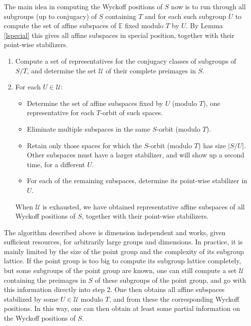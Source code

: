 \documentclass[12pt]{amsart}
\newcommand{\E}{{\mathbb E}}
\newcommand{\U}{{\mathcal U}}
\begin{document}
The main idea in computing the Wyckoff positions of $S$ now is to run 
through all subgroups (up to conjugacy) of $S$ containing $T$ and for 
each such subgroup $U$ to compute the set of affine subspaces of $\E$ 
fixed modulo $T$ by $U$.  By Lemma  \ref{lspecial} this gives all affine 
subspaces in special position, together with their point-wise stabilizers.

\vspace{0.5cm}
\begin{enumerate}
\item \label{WCconj}
        Compute a set of representatives for the conjugacy
        classes of subgroups of $S/T$, and determine the set $\U$ 
        of their complete preimages in $S$.
\item\label{WCfixed}
   For each $U\in\U$:
   \begin{itemize}
      \item
        Determine the set of affine subspaces fixed by $U$ (modulo $T$), 
        one representative for each $T$-orbit of such spaces. 
      \item
        Eliminate multiple subspaces in the same $S$-orbit (modulo $T$).
      \item
        Retain only those spaces for which the $S$-orbit (modulo $T$) 
        has size $|S/U|$.
        Other subspaces must have a larger stabilizer,
        and will show up a second time, for a different $U$.
      \item
        For each of the remaining subspaces, determine its point-wise 
        stabilizer in $U$.
   \end{itemize}
   When $\U$ is exhausted, we have obtained representative affine 
   subspaces of all Wyckoff positions of $S$, together with their 
   point-wise stabilizers.
\end{enumerate}
\vspace{0.5cm}

The algorithm described above is dimension independent and works, 
given sufficient resources, for arbitrarily large groups and 
dimensions.  In practice, it is mainly limited by the size of the 
point group and the complexity of its subgroup lattice.
If the point group is too big to compute its subgroup lattice
completely, but some subgroups of the point group are known, one
can still compute a set $\U$ containing the preimages in $S$ of 
these subgroups of the point group, and go with this information 
directly into step 2. One then obtains all affine subspaces 
stabilized by some $U\in\U$ modulo $T$, and from these the 
corresponding Wyckoff positions. In this way, one can then obtain 
at least some partial information on the Wyckoff positions of $S$.
\end{document}
